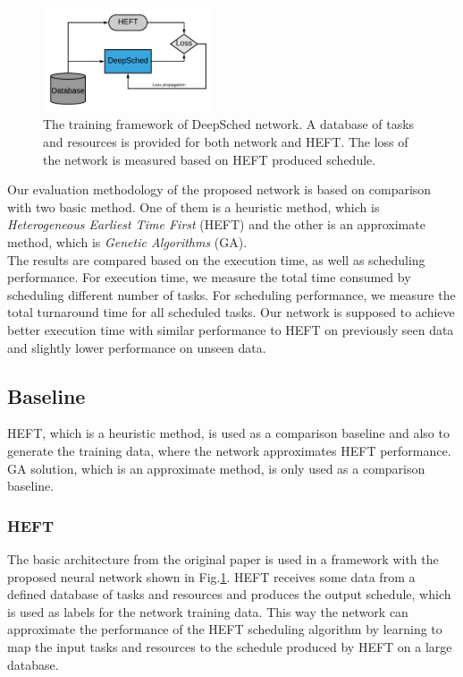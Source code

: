 \begin{figure}[hp]
    \centering
    \includegraphics[width=0.45\textwidth]{diagrams/framework}
    \caption{The training framework of DeepSched network. A database of tasks and resources is provided for both network and HEFT. The loss of the network is measured based on HEFT produced schedule.}
    \label{fig:fw}
\end{figure}

Our evaluation methodology of the proposed network is based on comparison with two basic method. One of them is a heuristic method, which is \emph{Heterogeneous Earliest Time First} (HEFT) and the other is an approximate method, which is \emph{Genetic Algorithms} (GA). \\

The results are compared based on the execution time, as well as scheduling performance. For execution time, we measure the total time consumed by scheduling different number of tasks. For scheduling performance, we measure the total turnaround time for all scheduled tasks. Our network is supposed to achieve better execution time with similar performance to HEFT on previously seen data and slightly lower performance on unseen data. 

\subsection{Baseline}
HEFT, which is a heuristic method, is used as a comparison baseline and also to generate the training data, where the network approximates HEFT performance. GA solution, which is an approximate method, is only used as a comparison baseline. \\

\subsubsection{HEFT}
The basic architecture from the original paper \cite{993206} is used in a framework with the proposed neural network shown in Fig.\ref{fig:fw}. HEFT receives some data from a defined database of tasks and resources and produces the output schedule, which is used as labels for the network training data. This way the network can approximate the performance of the HEFT scheduling algorithm by learning to map the input tasks and resources to the schedule produced by HEFT on a large database. \\

